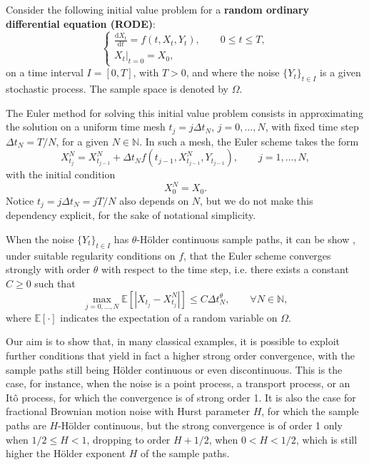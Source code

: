 \documentclass[reqno,12pt]{amsart}
\theoremstyle{plain}%
\theoremstyle{definition}
\begin{document}
Consider the following initial value problem for a \textbf{random ordinary differential equation (RODE)}:
\begin{equation}
  \label{rodeeq}
  \begin{cases}
    \displaystyle \frac{\mathrm{d}X_t}{\mathrm{d} t} = f(t, X_t, Y_t), \qquad 0 \leq t \leq T, \\
    \left. X_t \right|_{t = 0} = X_0,
  \end{cases}
\end{equation}
on a time interval $I=[0, T]$, with $T > 0$, and where the noise $\{Y_t\}_{t\in I}$ is a given stochastic process. The sample space is denoted by $\Omega$.

The Euler method for solving this initial value problem consists in approximating the solution on a uniform time mesh $t_j = j\Delta t_N$, $j = 0, \ldots, N$, with fixed time step $\Delta t_N = T/N$, for a given $N\in \mathbb{N}$. In such a mesh, the Euler scheme takes the form
\begin{equation}
  \label{emscheme}
  X_{t_j}^N = X_{t_{j-1}}^N + \Delta t_N f(t_{j-1}, X_{t_{j-1}}^N, Y_{t_{j-1}}), \qquad j = 1, \ldots, N,
\end{equation}
with the initial condition
\begin{equation}
  \label{iccondition}
  X_0^N = X_0.
\end{equation}
Notice $t_j = j\Delta t_N = jT/N$ also depends on $N$, but we do not make this dependency explicit, for the sake of notational simplicity.

When the noise $\{Y_t\}_{t\in I}$ has $\theta$-H\"older continuous sample paths, it can be show \cite{GruneKloeden2001}, under suitable regularity conditions on $f$, that the Euler scheme converges strongly with order $\theta$ with respect to the time step, i.e. there exists a constant $C \geq 0$ such that
\begin{equation}
    \label{strongordertheta}
    \max_{j=0, \ldots, N}\mathbb{E}\left[ \left| X_{t_j} - X_{t_j}^N \right| \right] \leq C \Delta t_N^\theta, \qquad \forall N \in \mathbb{N},
\end{equation}
where $\mathbb{E}[\cdot]$ indicates the expectation of a random variable on $\Omega$.

Our aim is to show that, in many classical examples, it is possible to exploit further conditions that yield in fact a higher strong order convergence, with the sample paths still being H\"older continuous or even discontinuous. This is the case, for instance, when the noise is a point process, a transport process, or an It\^o process, for which the convergence is of strong order 1. It is also the case for fractional Brownian motion noise with Hurst parameter $H$, for which the sample paths are $H$-H\"older continuous, but the strong convergence is of order 1 only when $1/2 \leq H < 1$, dropping to order $H + 1/2$, when $0 < H < 1/2$, which is still higher the H\"older exponent $H$ of the sample paths.
\end{document}
